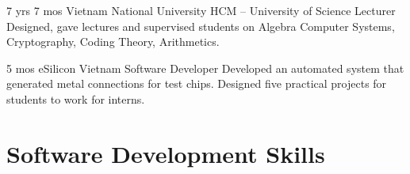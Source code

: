 \documentclass[11pt]{article} %
\begin{document}
\begin{paracol}{2}

{7 yrs 7 mos} %
{Vietnam National University HCM -- University of Science} %
{Lecturer} %
{Designed, gave lectures and supervised students on Algebra Computer Systems, Cryptography, Coding Theory, Arithmetics.} %


{5 mos} %
{eSilicon Vietnam} %
{Software Developer} %
{Developed an automated system that generated metal connections for test chips.
Designed five practical projects for students to work for interns.} %


\vspace{-\baselineskip}\medskip %



\switchcolumn %



\section{Software Development Skills} 





\begin{supertabular}{rl} %


\end{supertabular}
\end{paracol}
\end{document}
